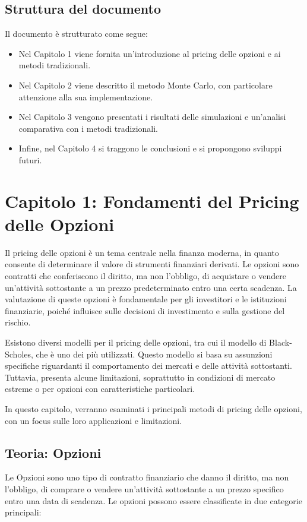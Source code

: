 \documentclass[12pt,a4paper]{report}
\begin{document}
\subsection{Struttura del documento}
Il documento è strutturato come segue:
\begin{itemize}
    \item Nel Capitolo 1 viene fornita un'introduzione al pricing delle opzioni e ai metodi tradizionali.
    \item Nel Capitolo 2 viene descritto il metodo Monte Carlo, con particolare attenzione alla sua implementazione.
    \item Nel Capitolo 3 vengono presentati i risultati delle simulazioni e un'analisi comparativa con i metodi tradizionali.
    \item Infine, nel Capitolo 4 si traggono le conclusioni e si propongono sviluppi futuri.
\end{itemize}

\newpage
\section{Capitolo 1: Fondamenti del Pricing delle Opzioni}

Il pricing delle opzioni è un tema centrale nella finanza moderna, in quanto consente di determinare il valore di strumenti finanziari derivati. Le opzioni sono contratti che conferiscono il diritto, ma non l'obbligo, di acquistare o vendere un'attività sottostante a un prezzo predeterminato entro una certa scadenza. La valutazione di queste opzioni è fondamentale per gli investitori e le istituzioni finanziarie, poiché influisce sulle decisioni di investimento e sulla gestione del rischio.

Esistono diversi modelli per il pricing delle opzioni, tra cui il modello di Black-Scholes, che è uno dei più utilizzati. Questo modello si basa su assunzioni specifiche riguardanti il comportamento dei mercati e delle attività sottostanti. Tuttavia, presenta alcune limitazioni, soprattutto in condizioni di mercato estreme o per opzioni con caratteristiche particolari.

In questo capitolo, verranno esaminati i principali metodi di pricing delle opzioni, con un focus sulle loro applicazioni e limitazioni.

\subsection{Teoria: Opzioni}
Le Opzioni sono uno tipo di contratto finanziario che danno il diritto, ma non l'obbligo, di comprare o vendere un'attività sottostante a un prezzo specifico entro una data di scadenza. Le opzioni possono essere classificate in due categorie principali:
\end{document}
